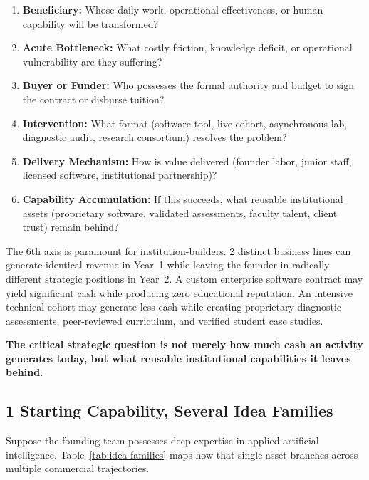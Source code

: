 \begin{enumerate}[leftmargin=12pt,itemsep=2pt,topsep=1pt,parsep=0pt]
  \item \textbf{Beneficiary:} Whose daily work, operational effectiveness, or human capability will be transformed?
  \item \textbf{Acute Bottleneck:} What costly friction, knowledge deficit, or operational vulnerability are they suffering?
  \item \textbf{Buyer or Funder:} Who possesses the formal authority and budget to sign the contract or disburse tuition?
  \item \textbf{Intervention:} What format (software tool, live cohort, asynchronous lab, diagnostic audit, research consortium) resolves the problem?
  \item \textbf{Delivery Mechanism:} How is value delivered (founder labor, junior staff, licensed software, institutional partnership)?
  \item \textbf{Capability Accumulation:} If this succeeds, what reusable institutional assets (proprietary software, validated assessments, faculty talent, client trust) remain behind?
\end{enumerate}

The 6th axis is paramount for institution-builders. 2 distinct business lines can generate identical revenue in Year~1 while leaving the founder in radically different strategic positions in Year~2. A custom enterprise software contract may yield significant cash while producing zero educational reputation. An intensive technical cohort may generate less cash while creating proprietary diagnostic assessments, peer-reviewed curriculum, and verified student case studies.

\textbf{The critical strategic question is not merely how much cash an activity generates today, but what reusable institutional capabilities it leaves behind.}

\subsection{1 Starting Capability, Several Idea Families}

Suppose the founding team possesses deep expertise in applied artificial intelligence. Table~\ref{tab:idea-families} maps how that single asset branches across multiple commercial trajectories.

